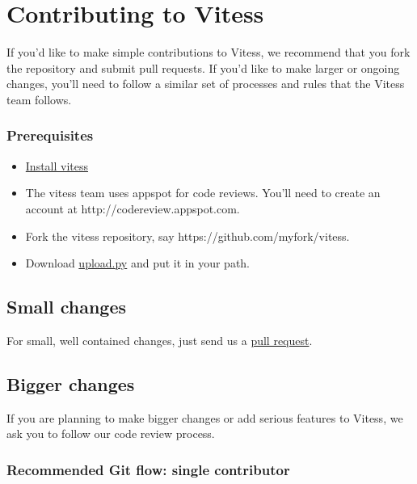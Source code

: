 \section{Contributing to Vitess}\hypertarget{contributing-to-vitess}{}\label{contributing-to-vitess}

If you'd like to make simple contributions to Vitess, we recommend that you fork
the repository and submit pull requests. If you'd like to make larger or ongoing
changes, you'll need to follow a similar set of processes and rules that the
Vitess team follows.

\subsubsection{Prerequisites}\hypertarget{prerequisites}{}\label{prerequisites}

\begin{itemize}
\item \href{https://github.com/youtube/vitess/blob/master/doc/GettingStarted.markdown}{Install vitess}
\item The vitess team uses appspot for code reviews. You'll need to create an account at http://codereview.appspot.com.
\item Fork the vitess repository, say https://github.com/myfork/vitess.
\item Download \href{https://code.google.com/p/rietveld/wiki/UploadPyUsage}{upload.py} and put it in your path.
\end{itemize}

\subsection{Small changes}\hypertarget{small-changes}{}\label{small-changes}

For small, well contained changes, just send us a
\href{https://help.github.com/articles/using-pull-requests}{pull request}.

\subsection{Bigger changes}\hypertarget{bigger-changes}{}\label{bigger-changes}

If you are planning to make bigger changes or add serious features to Vitess, we
ask you to follow our code review process.

\subsubsection{Recommended Git flow: single contributor}\hypertarget{recommended-git-flow-single-contributor}{}\label{recommended-git-flow-single-contributor}

